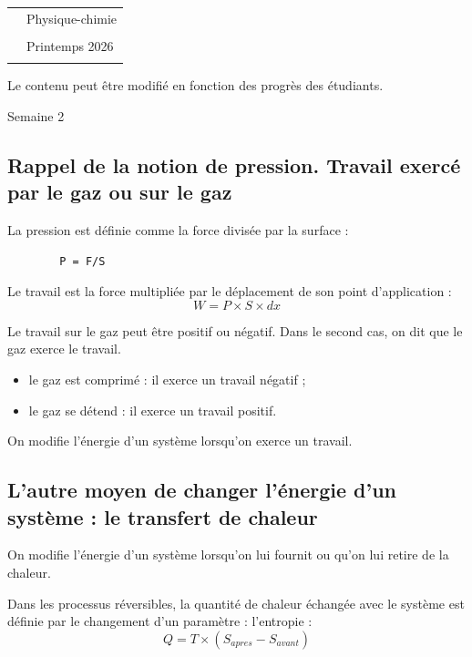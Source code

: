 \documentclass[11pt]{article}
\begin{document}
	
	\begin{tabular}{ l l }
		
		& \LARGE Physique-chimie \\\\
		& \LARGE Printemps 2026 \\\\
	\end{tabular}
	\vspace{10mm}
	
	
	Le contenu peut être modifié en fonction des progrès des étudiants.
	
	Semaine 2  
	
	\subsection*{Rappel de la notion de pression. Travail exercé par le gaz ou sur le gaz}
	
	La pression est définie comme la force divisée par la surface :
	\begin{lstlisting}
		P = F/S
	\end{lstlisting}
	
	Le travail est la force multipliée par le déplacement de son point d'application :
	\[
	W = P \times S \times dx
	\]
	
	Le travail sur le gaz peut être positif ou négatif. Dans le second cas, on dit que le gaz exerce le travail.
	\begin{itemize}
		\item le gaz est comprimé : il exerce un travail négatif ;
		\item le gaz se détend : il exerce un travail positif.
	\end{itemize}
	
	On modifie l'énergie d'un système lorsqu'on exerce un travail.
	
	\subsection*{L'autre moyen de changer l'énergie d'un système : le transfert de chaleur}
	
	On modifie l'énergie d'un système lorsqu'on lui fournit ou qu'on lui retire de la chaleur.
	
	Dans les processus réversibles, la quantité de chaleur échangée avec le système est définie par le changement d'un paramètre : l'entropie :
	\[
	Q = T \times (S_{apres}- S_{avant})
	\]
	
\end{document}
